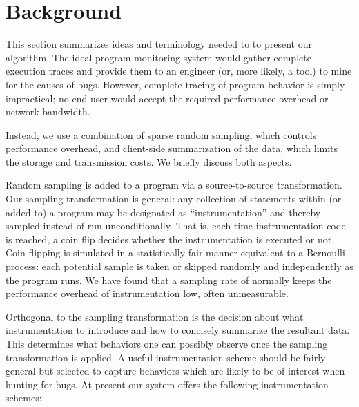 \documentclass[10pt]{acmconfbig}
\begin{document}
\section{Background}
\label{sec:background}

This section summarizes ideas and terminology needed to to present our
algorithm.  The ideal program monitoring system would gather complete
execution traces and provide them to an engineer (or, more likely, a
tool) to mine for the causes of bugs.  However, complete tracing of
program behavior is simply impractical; no end user would accept the
required performance overhead or network bandwidth.

Instead, we use a combination of sparse random sampling, which controls
performance overhead, and client-side summarization of the data, which
limits the storage and transmission costs.  We briefly discuss
both aspects.

Random sampling is added to a program via a source-to-source transformation.
Our sampling transformation is general: any collection of
statements within (or added to) a program may be designated as
``instrumentation'' and thereby sampled instead of run
unconditionally.  That is, each time instrumentation code is reached,
a coin flip decides whether the instrumentation is executed or not.
Coin flipping is simulated in a statistically fair
manner equivalent to a Bernoulli process: each potential sample is
taken or skipped randomly and independently as the program runs.
We have found that a sampling rate of  normally keeps the performance overhead
of instrumentation low, often unmeasurable.

Orthogonal to the sampling transformation is the decision about what
instrumentation to introduce and how to concisely
summarize the resultant data.  This determines what behaviors one can
possibly observe once the sampling transformation is applied.  A useful instrumentation
scheme should be fairly general but selected to capture behaviors
which are likely to be of interest when hunting for bugs.  At present
our system offers the following instrumentation schemes:
\end{document}
